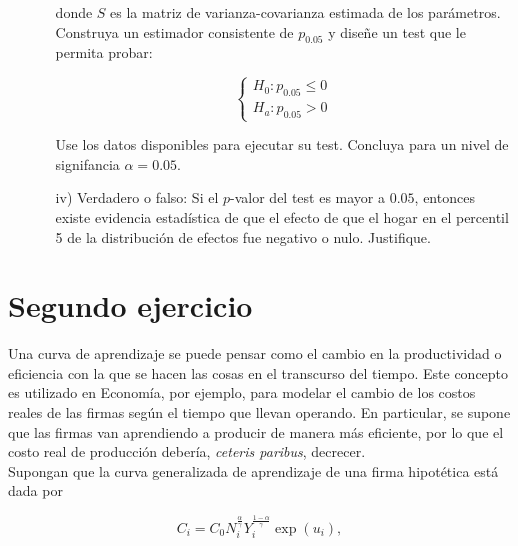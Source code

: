 \documentclass[a4paper]{article}
\begin{document}
\begin{itemize}
\begin{itemize}
    donde $S$ es la matriz de varianza-covarianza estimada de los parámetros.\\
    
    Construya un estimador consistente de $p_{0.05}$ y diseñe un test que le permita probar:
    
    \[
    \begin{cases}
    H_0: p_{0.05}\leq0\\
    H_a: p_{0.05}>0
    \end{cases}
    \]
    
    Use los datos disponibles para ejecutar su test. Concluya para un nivel de signifancia $\alpha=0.05$.
    
    \item[iv)] Verdadero o falso: Si el $p$-valor del test es mayor a $0.05$, entonces existe evidencia estadística de que el efecto de que el hogar en el percentil 5 de la distribución de efectos fue negativo o nulo. Justifique.

    
\end{itemize}

  
   
    
\end{itemize}


\bigskip


\section*{Segundo ejercicio}

Una curva de aprendizaje se puede pensar como el cambio en la productividad o eficiencia con la que se hacen las cosas en el transcurso del tiempo. Este concepto es utilizado en Economía, por ejemplo, para modelar el cambio de los costos reales de las firmas según el tiempo que llevan operando. En particular, se supone que las firmas van aprendiendo a producir de manera más eficiente, por lo que el costo real de producción debería, \textit{ceteris paribus}, decrecer.\\

Supongan que la curva generalizada de aprendizaje de una firma hipotética está dada por

\begin{equation}
    C_{i} = C_{0}N_{i}^{\frac{\alpha}{\gamma}}Y_{i}^{\frac{1-\alpha}{\gamma}}\exp(u_{i}), \tag{1}
    \label{eqn:2}
\end{equation}
\end{document}
